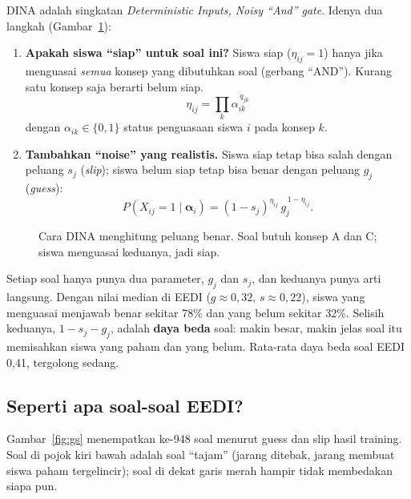 \documentclass[11pt,a4paper]{article}
\begin{document}
DINA adalah singkatan \emph{Deterministic Inputs, Noisy ``And'' gate}. Idenya dua langkah (Gambar~\ref{fig:tree}):

\begin{enumerate}
  \item \textbf{Apakah siswa ``siap'' untuk soal ini?} Siswa siap ($\eta_{ij}=1$) hanya jika menguasai \emph{semua}
        konsep yang dibutuhkan soal (gerbang ``AND''). Kurang satu konsep saja berarti belum siap.
        \[\eta_{ij}=\prod_{k}\alpha_{ik}^{\,q_{jk}}\]
        dengan $\alpha_{ik}\in\{0,1\}$ status penguasaan siswa $i$ pada konsep $k$.
  \item \textbf{Tambahkan ``noise'' yang realistis.} Siswa siap tetap bisa salah dengan peluang $s_j$ (\emph{slip});
        siswa belum siap tetap bisa benar dengan peluang $g_j$ (\emph{guess}):
        \[P(X_{ij}=1\mid\boldsymbol\alpha_i)=(1-s_j)^{\eta_{ij}}\,g_j^{\,1-\eta_{ij}}.\]
\end{enumerate}

\begin{figure}[h]
  \centering
  \resizebox{0.95\linewidth}{!}{}
  \caption{Cara DINA menghitung peluang benar. Soal butuh konsep A dan C; siswa menguasai keduanya, jadi siap.}
  \label{fig:tree}
\end{figure}

Setiap soal hanya punya dua parameter, $g_j$ dan $s_j$, dan keduanya punya arti langsung. Dengan nilai median di
EEDI ($g\approx0{,}32$, $s\approx0{,}22$), siswa yang menguasai menjawab benar sekitar 78\% dan yang belum sekitar 32\%.
Selisih keduanya, $1-s_j-g_j$, adalah \textbf{daya beda} soal: makin besar, makin jelas soal itu memisahkan siswa
yang paham dan yang belum. Rata-rata daya beda soal EEDI 0,41, tergolong sedang.

\subsection{Seperti apa soal-soal EEDI?}

Gambar~\ref{fig:gs} menempatkan ke-948 soal menurut guess dan slip hasil training. Soal di pojok kiri bawah adalah
soal ``tajam'' (jarang ditebak, jarang membuat siswa paham tergelincir); soal di dekat garis merah hampir tidak
membedakan siapa pun.
\end{document}
